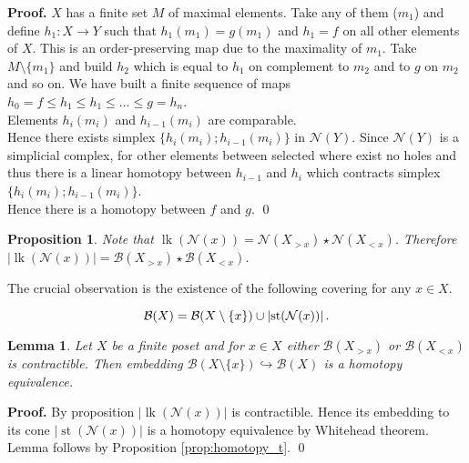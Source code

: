 \documentclass[a4paper, 12pt]{article}
\newcounter{stmcounter}[section]
\numberwithin{equation}{section}
\newtheorem{proposition}[stmcounter]{Proposition}
\newtheorem{lemma}[stmcounter]{Lemma}
\theoremstyle{definition}
\theoremstyle{remark}
\newenvironment{pf}{\noindent\textbf{Proof.}}{\qed}
\renewcommand{\leq}{\leqslant}
\begin{document}
\begin{pf}
  $X$ has a finite set $M$ of maximal elements. Take any of them ($m_1$) and define $h_1 : X \to Y$ such that $h_1(m_1) = g(m_1)$ and $h_1 = f$ on all other elements of $X$. This is an order-preserving map due to the maximality of $m_1$. Take $M \setminus \{m_1\}$ and build $h_2$ which is equal to $h_1$ on complement to $m_2$ and to $g$ on $m_2$ and so on. We have built a finite sequence of maps $h_0 = f \leq h_1 \leq h_1 \leq \ldots \leq g = h_n$.\\

  Elements $h_i(m_i)$ and $h_{i-1}(m_i)$ are comparable.\\
  Hence there exists simplex $\{h_i(m_i); h_{i-1}(m_i)\}$ in $\mathcal{N}(Y)$. Since $\mathcal{N}(Y)$ is a simplicial complex, for other elements between selected where exist no holes and thus there is a linear homotopy between $h_{i-1}$ and $h_{i}$ which contracts simplex $\{h_i(m_i); h_{i-1}(m_i)\}$.\\

  Hence there is a homotopy between $f$ and $g$.
\end{pf}

\begin{proposition}
  Note that $\operatorname{lk}(\mathcal{N}(x)) = \mathcal{N}(X_{>x}) \star \mathcal{N}(X_{<x})$. Therefore $\left|\operatorname{lk}(\mathcal{N}(x))\right| = \mathcal{B}(X_{>x}) \star \mathcal{B}(X_{<x})$.
\end{proposition}

The crucial observation is the existence of the following covering for any $x \in X$.

\begin{equation}\label{covering}
  \mathcal{B}(X) = \mathcal{B}(X \setminus \{x\}) \cup \left|\operatorname{st}(\mathcal{N}(x))\right|.\\
\end{equation}

\begin{lemma}
  \label{lem:homotopy}
  Let $X$ be a finite poset and for $x \in X$ either $\mathcal{B}(X_{>x})$ or $\mathcal{B}(X_{<x})$ is contractible. Then embedding $\mathcal{B}(X \setminus \{x\}) \hookrightarrow \mathcal{B}(X)$ is a homotopy equivalence.
\end{lemma}

\begin{pf}
  By proposition $\left|\operatorname{lk}(\mathcal{N}(x))\right|$ is contractible. Hence its embedding to its cone $\left|\operatorname{st}(\mathcal{N}(x))\right|$ is a homotopy equivalence by Whitehead theorem. Lemma follows by Proposition \ref{prop:homotopy_t}.
\end{pf}
\end{document}
